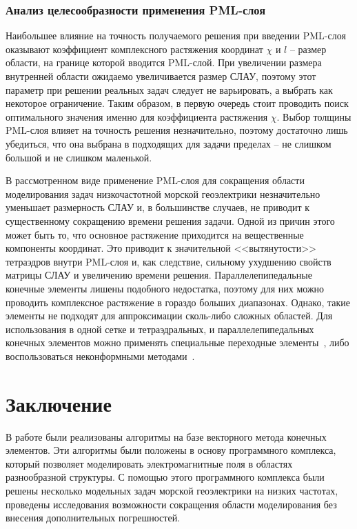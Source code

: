 \documentclass[a4paper,12pt]{article}
\begin{document}

\subsubsection{Анализ целесообразности применения PML-слоя}
Наибольшее влияние на точность получаемого решения при введении PML-слоя оказывают коэффициент комплексного растяжения координат $\chi$ и $l$ -- размер области, на границе которой вводится PML-слой. При увеличении размера внутренней области ожидаемо увеличивается размер СЛАУ, поэтому этот параметр при решении реальных задач следует не варьировать, а выбрать как некоторое ограничение. Таким образом, в первую очередь стоит проводить поиск оптимального значения именно для коэффициента растяжения $\chi$. Выбор толщины PML-слоя влияет на точность решения незначительно, поэтому достаточно лишь убедиться, что она выбрана в подходящих для задачи пределах -- не слишком большой и не слишком маленькой.

В рассмотренном виде применение PML-слоя для сокращения области моделирования задач низкочастотной морской геоэлектрики незначительно уменьшает размерность СЛАУ и, в большинстве случаев, не приводит к существенному сокращению времени решения задачи. Одной из причин этого может быть то, что основное растяжение приходится на вещественные компоненты координат. Это приводит к значительной <<вытянутости>> тетраэдров внутри PML-слоя и, как следствие, сильному ухудшению свойств матрицы СЛАУ и увеличению времени решения. Параллелепипедальные конечные элементы лишены подобного недостатка, поэтому для них можно проводить комплексное растяжение в гораздо больших диапазонах. Однако, такие элементы не подходят для аппроксимации сколь-либо сложных областей. Для использования в одной сетке и тетраэдральных, и параллелепипедальных конечных элементов можно применять специальные переходные элементы~\citep{extra_elements1,extra_elements2}, либо воспользоваться неконформными методами~\citep{dg1,dg2,dg3,mortar1,mortar2}.


\clearpage
{}
\section*{Заключение}
В работе были реализованы алгоритмы на базе векторного метода конечных элементов. Эти алгоритмы были положены в основу программного комплекса, который позволяет моделировать электромагнитные поля в областях разнообразной структуры. С помощью этого программного комплекса были решены несколько модельных задач морской геоэлектрики на низких частотах, проведены исследования возможности сокращения области моделирования без внесения дополнительных погрешностей.
\end{document}
